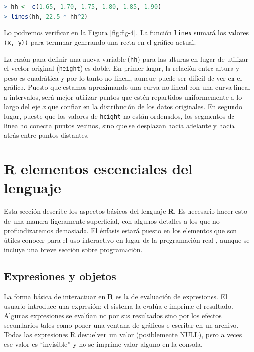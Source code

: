 \documentclass[spanish]{extbook}
\numberwithin{equation}{section}
\numberwithin{figure}{section}
\begin{document}
\begin{lstlisting}[language=R]
> hh <- c(1.65, 1.70, 1.75, 1.80, 1.85, 1.90)
> lines(hh, 22.5 * hh^2)
\end{lstlisting}

Lo podremos verificar en la Figura \ref{fig:fig-4}. La función \texttt{lines}
sumará los valores \texttt{(x, y))} para terminar generando una recta en el
gráfico actual.

La razón para definir una nueva variable (\texttt{hh}) para las alturas en
lugar de utilizar el vector original (\texttt{height}) es doble. En primer
lugar, la relación entre altura y peso es cuadrática y por lo tanto no lineal,
aunque puede ser difícil de ver en el gráfico. Puesto que estamos aproximando
una curva no lineal con una curva lineal a intervalos, será mejor utilizar
puntos que estén repartidos uniformemente a lo largo del eje \textit{x} que
confiar en la distribución de los datos originales. En segundo lugar, puesto
que los valores de \texttt{height} no están ordenados, los segmentos de línea
no conecta puntos vecinos, sino que se desplazan hacia adelante y hacia atrás
entre puntos distantes.

\section{R elementos escenciales del lenguaje}

Esta sección describe los aspectos básicos del lenguaje \textbf{R}. Es
necesario hacer esto de una manera ligeramente superficial, con algunos
detalles a los que no profundizaremos demasiado.  El énfasis estará puesto en los
elementos que son útiles conocer para el uso interactivo en lugar de la
programación real , aunque se incluye una breve sección sobre programación.

\subsection{Expresiones y objetos}

La forma básica de interactuar en \textbf{R} es la de evaluación de
expresiones. El usuario introduce una expresión; el sistema la evalúa e imprime
el resultado.  Algunas expresiones se evalúan no por sus resultados sino por
los efectos secundarios tales como poner una ventana de gráficos o escribir en
un archivo. Todas las expresiones R devuelven un valor (posiblemente NULL),
pero a veces ese valor es ``invisible''  y no se imprime valor alguno en la
consola.
\end{document}
